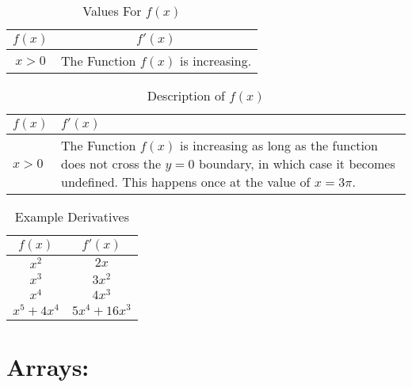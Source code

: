 \documentclass[11pt]{article} %
\begin{document}
\vspace{1cm} %

\begin{table}[h!] %
\centering
\def\arraystretch{1.4}
\caption{Values For $f(x)$}
\begin{tabular}{|c|c|}
    \hline
    $f(x)$ & $f'(x)$ \\ \hline
    $x > 0$ & The Function $f(x)$ is increasing. \\ \hline
\end{tabular}
\end{table}

\vspace{1cm} %

\begin{table}[h!] %
\centering
\caption{Description of $f(x)$}
\def\arraystretch{1.4}
\begin{tabular}{|l|p{4in}|} %
    \hline
    $f(x)$ & $f'(x)$ \\ \hline
    $x > 0$ & The Function $f(x)$ is increasing as long as the function does not cross the $y=0$ boundary,
    in which case it becomes undefined. This happens once at the value of $x = 3\pi$. \\ \hline
\end{tabular}
\end{table}

\vspace{1cm} %

\begin{table}[h!]
\centering
{}
\def\arraystretch{1.4}
\caption{Example Derivatives}
\begin{tabular}{|c|c|}
\rowcolor{gray!50}
    \hline
    $f(x)$ & $f'(x)$ \\ \hline
    $x^{2}$ & $2x$\\ \hline
    $x^3$ & $3x^2$ \\ \hline
    $x^4$ & $4x^3$ \\ \hline
    $x^5 + 4x^4$ & $5x^4 + 16x^3$ \\ \hline
\end{tabular}
\end{table}

\pagebreak

\section{Arrays:}
\end{document}
